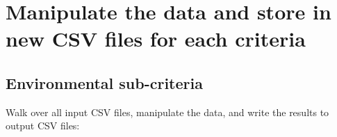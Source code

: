 \documentclass [oneside,10pt,a4paper,ngerman,BCOR10mm,headsepline,parindent,final]{scrartcl}
\begin{document}
    \hypertarget{manipulate-the-data-and-store-in-new-csv-files-for-each-criteria}{%
\section{Manipulate the data and store in new CSV files for each
criteria}\label{manipulate-the-data-and-store-in-new-csv-files-for-each-criteria}}

\hypertarget{environmental-sub-criteria}{%
\subsection{Environmental
sub-criteria}\label{environmental-sub-criteria}}

Walk over all input CSV files, manipulate the data, and write the
results to output CSV files:
\end{document}
